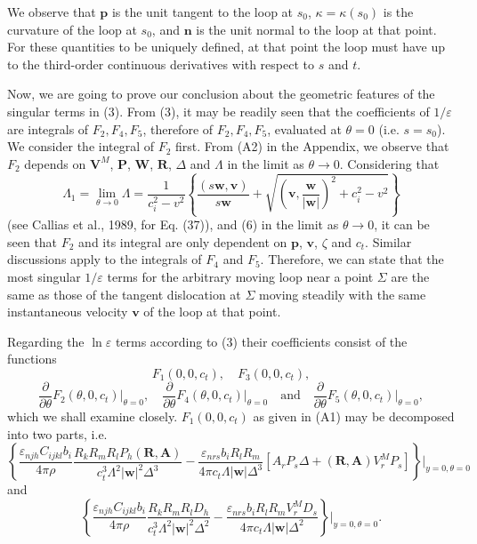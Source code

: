 \documentclass[12pt]{article}
\begin{document}
We observe that $\mathbf{p}$ is the unit tangent to the loop at $s_0$, $\kappa=\kappa(s_0)$ is the curvature of the loop at $s_0$, and $\mathbf{n}$ is the unit normal to the loop at that point. For these quantities to be uniquely defined, at that point the loop must have up to the third-order continuous derivatives with respect to $s$ and $t$.

Now, we are going to prove our conclusion about the geometric features of the singular terms in (3). From (3), it may be readily seen that the coefficients of $1/\varepsilon$ are integrals of $F_2, F_4, F_5$, therefore of $F_2, F_4, F_5$, evaluated at $\theta=0$ (i.e. $s=s_0$). We consider the integral of $F_2$ first. From (A2) in the Appendix, we observe that $F_2$ depends on $\mathbf{V}^M$, $\mathbf{P}$, $\mathbf{W}$, $\mathbf{R}$, $\Delta$ and $\Lambda$ in the limit as $\theta\to 0$. Considering that
\[
\Lambda_1 = \lim_{\theta\to 0}\Lambda = \frac{1}{c_i^2-v^2}\left\{\frac{(s\mathbf{w},\mathbf{v})}{s\mathbf{w}} + \sqrt{\left(\mathbf{v},\frac{\mathbf{w}}{|\mathbf{w}|}\right)^2 + c_i^2 - v^2}\right\}
\]
(see Callias et al., 1989, for Eq. (37)), and (6) in the limit as $\theta\to 0$, it can be seen that $F_2$ and its integral are only dependent on $\mathbf{p}$, $\mathbf{v}$, $\zeta$ and $c_t$. Similar discussions apply to the integrals of $F_4$ and $F_5$. Therefore, we can state that the most singular $1/\varepsilon$ terms for the arbitrary moving loop near a point $\Sigma$ are the same as those of the tangent dislocation at $\Sigma$ moving steadily with the same instantaneous velocity $\mathbf{v}$ of the loop at that point.

Regarding the $\ln\varepsilon$ terms according to (3) their coefficients consist of the functions
\[
F_1(0,0,c_t), \quad F_3(0,0,c_t),
\]
\[
\frac{\partial}{\partial\theta}F_2(\theta,0,c_t)\big|_{\theta=0}, \quad \frac{\partial}{\partial\theta}F_4(\theta,0,c_t)\big|_{\theta=0} \quad \text{and} \quad \frac{\partial}{\partial\theta}F_5(\theta,0,c_t)\big|_{\theta=0},
\]
which we shall examine closely. $F_1(0,0,c_t)$ as given in (A1) may be decomposed into two parts, i.e.
\begin{equation}
\left\{\frac{\varepsilon_{njh}C_{ijkl}b_i}{4\pi\rho}\frac{R_k R_m R_l P_h(\mathbf{R},\mathbf{A})}{c_t^3\Lambda^2|\mathbf{w}|^2\Delta^3} - \frac{\varepsilon_{nrs}b_i R_l R_m}{4\pi c_t\Lambda|\mathbf{w}|\Delta^3}[A_r P_s\Delta + (\mathbf{R},\mathbf{A})V_r^M P_s]\right\}\bigg|_{y=0,\theta=0}
\end{equation}
and
\begin{equation}
\left\{\frac{\varepsilon_{njh}C_{ijkl}b_i}{4\pi\rho}\frac{R_k R_m R_l D_h}{c_t^3\Lambda^2|\mathbf{w}|^2\Delta^2} - \frac{\varepsilon_{nrs}b_i R_l R_m V_r^M D_s}{4\pi c_t\Lambda|\mathbf{w}|\Delta^2}\right\}\bigg|_{y=0,\theta=0}.
\end{equation}
\end{document}
